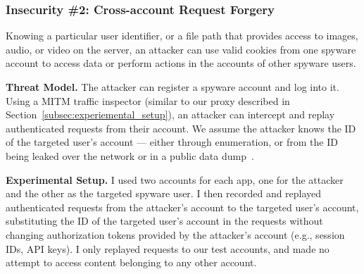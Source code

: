 
\subsubsection*{Insecurity \#2: Cross-account Request Forgery}

Knowing a particular user identifier, or a file path that provides access to images, audio, or video on the server, an attacker can use valid
cookies from one spyware account to access data or perform actions in
the accounts of other spyware users.

\textbf{Threat Model.} The attacker can register a spyware account and
log into it. Using a MITM traffic inspector (similar to our proxy
described in Section~\ref{subsec:experiemental_setup}), an attacker
can intercept and replay authenticated requests from their account. We
assume the attacker knows the ID of the targeted user's account ---
either through enumeration, or from the ID being leaked over the
network or in a public data dump~\cite{mSpybrea38:online,
  Companyt8:online, HackerSt66:online, Cerberus12:online,
  Stalkerw59:online}.


\textbf{Experimental Setup.} I used two accounts for each app, one
for the attacker and the other as the targeted spyware user.  I then
recorded and replayed authenticated requests from the attacker's
account to the targeted user's account, substituting the ID of the
targeted user's account in the requests without changing authorization
tokens provided by the attacker's account (e.g., session IDs, API
keys).  I only replayed requests to our test accounts, and
made no attempt to access content belonging to any other account.

